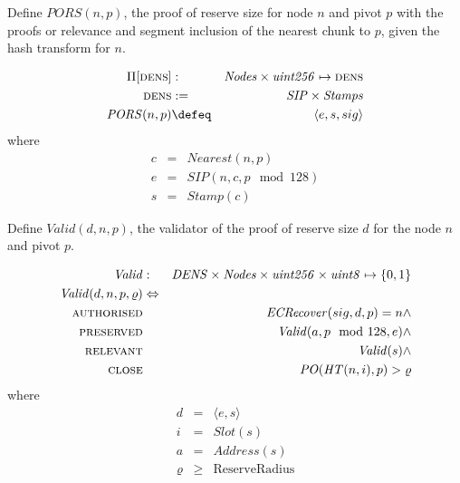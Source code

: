 \begin{definition}
\label{def:densityproof}
Define  $\mathit{PORS}(n,p)$, the proof of reserve size for node $n$ and pivot $p$ with the proofs or relevance and segment inclusion of the nearest chunk to $p$, given the hash transform for $n$.

\begin{eqnarray}
\Pi[\textsc{dens}]&:& \mathit{Nodes}\times \mathit{uint256} \mapsto \textsc{dens}\\
\textsc{dens} &:=&\mathit{SIP}\times\mathit{Stamps}
\\
\mathit{PORS}(n,p)&\defeq&\langle e, s, sig\rangle
\end{eqnarray}where\begin{eqnarray}
c&=&\mathit{Nearest}(n,p)\\
e&= &\mathit{SIP}(n,c,p \mod 128)\\
s&=&\mathit{Stamp}(c)
\end{eqnarray}
\end{definition}            


\begin{definition}
\label{def:densityproof-validity}
Define  $\mathit{Valid}(d,n,p)$, the validator of the proof of reserve size $d$ for the node $n$ and pivot $p$.

\begin{eqnarray}
\mathit{Valid}&:& 
\mathit{DENS}\times\mathit{Nodes}\times\mathit{uint256}\times\mathit{uint8}
\mapsto \{0,1\}
\\
\mathit{Valid}(d,n,p,\varrho)&\Leftrightarrow&\\
\textsc{authorised}&&\mathit{ECRecover}(sig,d,p)=n \wedge\\
\textsc{preserved}&&\mathit{Valid}(a,p\mod 128,e) \wedge\\
\textsc{relevant}&&\mathit{Valid}(s) \wedge\\
\textsc{close}&&\mathit{PO}(\mathit{HT}(n, i), p)>\varrho
\end{eqnarray}where\begin{eqnarray}
d&=&\langle e, s\rangle\\
i&=&\mathit{Slot}(s)\\
a&=&\mathit{Address}(s)\\
\varrho&\geq&\mathrm{ReserveRadius}
\end{eqnarray}
\end{definition}            


